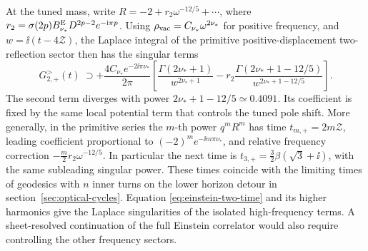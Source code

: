 At the tuned mass, write \(R=-2+r_2\omega^{-12/5}+\cdots\),
where \(r_2=\sigma(2p)B_{\nu_*}^{\rm E}D^{2p-2}e^{-\mathrm{i}\pi p}\).
Using \(\rho_{\rm vac}=C_{\nu_*}\omega^{2\nu_*}\) for positive
frequency, and \(w=\ii(t-4\mathcal Z)\), the Laplace integral
of the primitive positive-displacement two-reflection sector
then has the singular terms
\begin{equation}
 G^>_{2,+}(t)\ \supset+ \frac{4 C_{\nu_*} e^{-2\ii\pi\nu_*}}{2\pi}
 \left[
 \frac{\Gamma(2\nu_*+1)}{w^{2\nu_*+1}}
 -r_2\frac{\Gamma(2\nu_*+1-12/5)}{w^{2\nu_*+1-12/5}}
 \right].
 \label{eq:einstein-two-time}
\end{equation}
The second term diverges with power \(2\nu_*+1-12/5\simeq0.4091\).
Its coefficient is fixed by the same local potential term that
controls the tuned pole shift. More generally, in the primitive
series the \(m\)-th power \(q^mR^m\) has time
\(t_{m,+}=2m\mathcal Z\), leading coefficient proportional to
\((-2)^m e^{-\ii m\pi\nu_*}\), and relative frequency correction
\(-\tfrac m2 r_2\omega^{-12/5}\). In particular the next
time is \(t_{3,+}=\tfrac32\beta(\sqrt3+\ii)\), with the same
subleading singular power. These times coincide with the limiting
times of geodesics with \(n\) inner turns on the lower horizon
detour in section~\ref{sec:optical-cycles}. Equation \eqref{eq:einstein-two-time}
and its higher harmonics give the Laplace singularities of the isolated
high-frequency terms. A sheet-resolved continuation of the full
Einstein correlator would also require controlling the other
frequency sectors.
